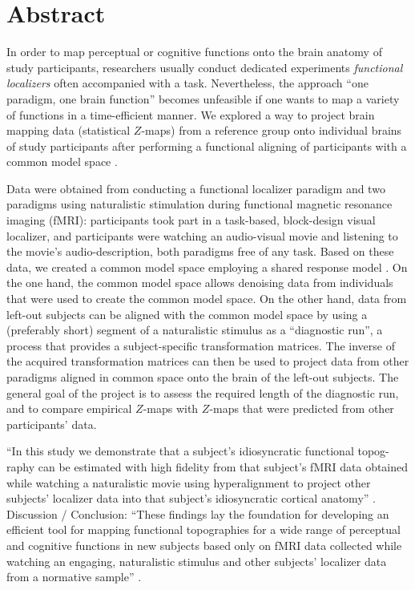 \section{Abstract}
In order to map perceptual or cognitive functions onto the brain anatomy of
study participants, researchers usually conduct dedicated experiments
\textit{functional localizers} often accompanied with a task.
Nevertheless, the approach ``one paradigm, one brain function'' becomes
unfeasible if one wants to map a variety of functions in a time-efficient
manner.
We explored a way to project brain mapping data (statistical $Z$-maps) from a
reference group onto individual brains of study participants after performing a
functional aligning of participants with a common model space .

%
Data were obtained from conducting a functional localizer paradigm and two
paradigms using naturalistic stimulation during functional magnetic resonance
imaging (fMRI):
%
participants took part in a task-based, block-design visual localizer, and
participants were watching an audio-visual movie and listening to the movie's
audio-description, both paradigms free of any task.
%
Based on these data, we created a common model space employing a shared response
model \citep{chen2015reduced}.
%
On the one hand, the common model space allows denoising data from individuals
that were used to create the common model space.
%
On the other hand, data from left-out subjects can be aligned with the common
model space by using a (preferably short) segment of a naturalistic stimulus as
a ``diagnostic run'', a process that provides a subject-specific transformation
matrices.
%
The inverse of the acquired transformation matrices can then be used to project
data from other paradigms aligned in common space onto the brain of the left-out
subjects.
%
The general goal of the project is to assess the required length of the
diagnostic run, and to compare empirical $Z$-maps with $Z$-maps that were
predicted from other participants' data.

%
``In this study we demonstrate that a subject's idiosyncratic functional topog-
raphy can be estimated with high ﬁdelity from that subject's fMRI data obtained
while watching a naturalistic movie using hyperalignment to project other
subjects’ localizer data into that subject's idiosyncratic cortical anatomy''
\citep{jiahui2020predicting}.
%
Discussion / Conclusion: ``These ﬁndings lay the foundation for developing an
efficient tool for mapping functional topographies for a wide range of
perceptual and cognitive functions in new subjects based only on fMRI data
collected while watching an engaging, naturalistic stimulus and other subjects'
localizer data from a normative sample'' \citep{jiahui2020predicting}.


